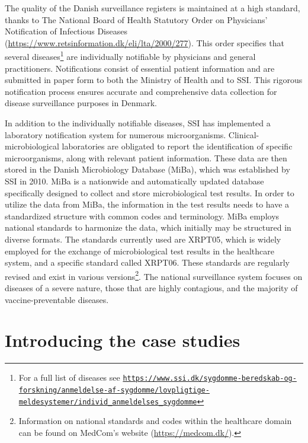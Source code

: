 \documentclass[a4paper,twoside,11pt]{report} %
\theoremstyle{definition}
\theoremstyle{definition}
\theoremstyle{definition}
\theoremstyle{definition}
\theoremstyle{remark}
\begin{document}
The quality of the Danish surveillance registers is maintained at a high standard, thanks to The National Board of Health Statutory Order on Physicians' Notification of Infectious Diseases (\href{https://www.retsinformation.dk/eli/lta/2000/277}{https://www.retsinformation.dk/eli/lta/2000/277}). This order specifies that several diseases\footnote{For a full list of diseases see \href{https://www.ssi.dk/sygdomme-beredskab-og-forskning/anmeldelse-af-sygdomme/lovpligtige-meldesystemer/individ_anmeldelses_sygdomme}{\nolinkurl{https://www.ssi.dk/sygdomme-beredskab-og-forskning/anmeldelse-af-sygdomme/lovpligtige-meldesystemer/individ_anmeldelses_sygdomme}}} are individually notifiable by physicians and general practitioners. Notifications consist of essential patient information and are submitted in paper form to both the Ministry of Health and to SSI. This rigorous notification process ensures accurate and comprehensive data collection for disease surveillance purposes in Denmark.

In addition to the individually notifiable diseases, SSI has implemented a laboratory notification system for numerous microorganisms. Clinical-microbiological laboratories are obligated to report the identification of specific microorganisms, along with relevant patient information. These data are then stored in the Danish Microbiology Database (MiBa), which was established by SSI in 2010. MiBa is a nationwide and automatically updated database specifically designed to collect and store microbiological test results. In order to utilize the data from MiBa, the information in the test results needs to have a standardized structure with common codes and terminology. MiBa employs national standards to harmonize the data, which initially may be structured in diverse formats. The standards currently used are XRPT05, which is widely employed for the exchange of microbiological test results in the healthcare system, and a specific standard called XRPT06. These standards are regularly revised and exist in various versions\footnote{Information on national standards and codes within the healthcare domain can be found on MedCom's website (\href{https://medcom.dk/}{https://medcom.dk/}).}. The national surveillance system focuses on diseases of a severe nature, those that are highly contagious, and the majority of vaccine-preventable diseases.

\section{Introducing the case studies}
\end{document}
